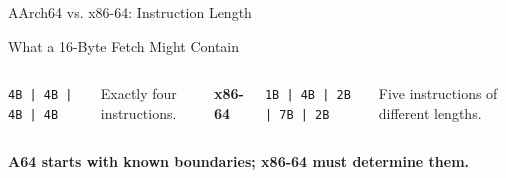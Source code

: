 \documentclass[aspectratio=169,11pt,t]{beamer}
\newcommand{\key}[1]{\textbf{#1}}
\newcommand{\code}[1]{\texttt{#1}}
\begin{document}
\begin{frame}{AArch64 vs. x86-64: Instruction Length}
\begin{block}{What a 16-Byte Fetch Might Contain}
\begin{columns}[T,onlytextwidth]
\vspace{0.05cm}

\code{4B | 4B | 4B | 4B}

\vspace{0.05cm}

Exactly four instructions.


\centering

\vspace{0.05cm}

\textbf{x86-64}

\code{1B | 4B | 2B | 7B | 2B}

Five instructions of different lengths.

\end{columns}

\end{block}

\vspace{0.05cm}

\begin{center}
\key{A64 starts with known boundaries; x86-64 must determine them.}
\end{center}

\end{frame}



\end{document}
